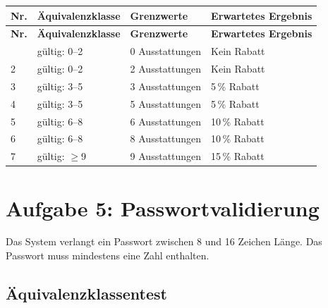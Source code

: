 \documentclass[
	fontsize=12pt,          %
	paper=a4,               %
	numbers=noenddot,       %
	listof=totoc,           %
	listof=entryprefix,     %
	listof=nochaptergap,    %
	bibliography=totoc,     %
	parskip=half,           %
	openany                 %
]{scrbook}
\begin{document}
\begin{longtable}{| p{0.5cm} | p{4.0cm} | p{4.5cm} | p{3.8cm} |}
	\hline
	\textbf{Nr.} & \textbf{Äquivalenzklasse} & \textbf{Grenzwerte} & \textbf{Erwartetes Ergebnis} \\ \hline
	\endfirsthead
	\hline
	\textbf{Nr.} & \textbf{Äquivalenzklasse} & \textbf{Grenzwerte} & \textbf{Erwartetes Ergebnis} \\ \hline
	\endhead
	\hline
	\endfoot
	1 & gültig: 0--2 & 0 Ausstattungen & Kein Rabatt \\ \hline
	2 & gültig: 0--2 & 2 Ausstattungen & Kein Rabatt \\ \hline
	3 & gültig: 3--5 & 3 Ausstattungen & 5\,\% Rabatt \\ \hline
	4 & gültig: 3--5 & 5 Ausstattungen & 5\,\% Rabatt \\ \hline
	5 & gültig: 6--8 & 6 Ausstattungen & 10\,\% Rabatt \\ \hline
	6 & gültig: 6--8 & 8 Ausstattungen & 10\,\% Rabatt \\ \hline
	7 & gültig: $\geq 9$ & 9 Ausstattungen & 15\,\% Rabatt \\ \hline
\end{longtable}


\chapter*{Aufgabe 5: Passwortvalidierung}

Das System verlangt ein Passwort zwischen 8 und 16 Zeichen Länge.
Das Passwort muss mindestens eine Zahl enthalten.

\section*{Äquivalenzklassentest}
\end{document}
